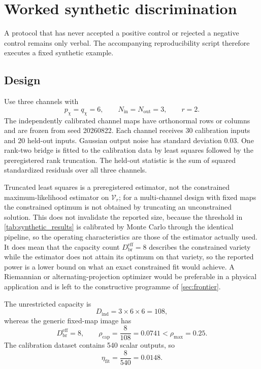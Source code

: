 \documentclass[11pt]{article}
\begin{document}
\section{Worked synthetic discrimination}
\label{sec:synthetic}

A protocol that has never accepted a positive control or rejected a negative control remains only verbal. The accompanying reproducibility script therefore executes a fixed synthetic example.

\subsection{Design}

Use three channels with
\begin{equation}
p_{\chi}=q_{\chi}=6,
\qquad
N_{\mathrm{in}}=N_{\mathrm{out}}=3,
\qquad
r=2.
\end{equation}
The independently calibrated channel maps have orthonormal rows or columns and are frozen from seed 20260822. Each channel receives 30 calibration inputs and 20 held-out inputs. Gaussian output noise has standard deviation \(0.03\). One rank-two bridge is fitted to the calibration data by least squares followed by the preregistered rank truncation. The held-out statistic is the sum of squared standardized residuals over all three channels.

Truncated least squares is a preregistered estimator, not the constrained maximum-likelihood estimator on \(\mathcal V_{r}\); for a multi-channel design with fixed maps the constrained optimum is not obtained by truncating an unconstrained solution. This does not invalidate the reported size, because the threshold in \cref{tab:synthetic_results} is calibrated by Monte Carlo through the identical pipeline, so the operating characteristics are those of the estimator actually used. It does mean that the capacity count \(D_{\mathrm{br}}^{\mathrm{eff}}=8\) describes the constrained variety while the estimator does not attain its optimum on that variety, so the reported power is a lower bound on what an exact constrained fit would achieve. A Riemannian or alternating-projection optimizer would be preferable in a physical application and is left to the constructive programme of \cref{sec:frontier}.

The unrestricted capacity is
\begin{equation}
D_{\mathrm{ind}}=3\times6\times6=108,
\end{equation}
whereas the generic fixed-map image has
\begin{equation}
D_{\mathrm{br}}^{\mathrm{eff}}=8,
\qquad
\rho_{\mathrm{cap}}=\frac{8}{108}=0.0741<\rho_{\max}=0.25.
\end{equation}
The calibration dataset contains 540 scalar outputs, so
\begin{equation}
\eta_{\mathrm{fit}}=\frac{8}{540}=0.0148.
\end{equation}
\end{document}
